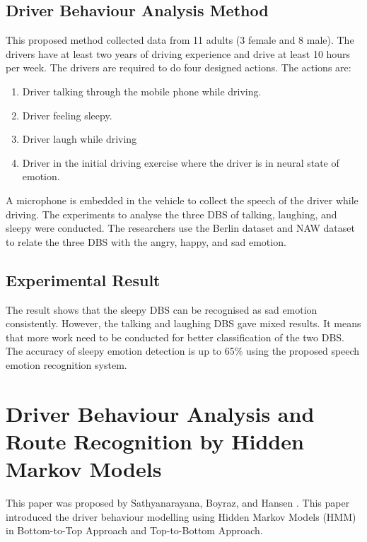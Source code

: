 \subsection{Driver Behaviour Analysis Method}
This proposed method collected data from 11 adults (3 female and 8 male). The drivers have at least two years of driving experience and drive at least 10 hours per week. The drivers are required to do four designed actions. The actions are: 
\begin{enumerate}
\item Driver talking through the mobile phone while driving.
\item Driver feeling sleepy.
\item Driver laugh while driving
\item Driver in the initial driving exercise where the driver is in neural state of emotion.
\end{enumerate}

A microphone is embedded in the vehicle to collect the speech of the driver while driving. The experiments to analyse the three DBS of talking, laughing, and sleepy were conducted. The researchers use the Berlin dataset and NAW dataset to relate the three DBS with the angry, happy, and sad emotion.

\subsection{Experimental Result}
The result shows that the sleepy DBS can be recognised as sad emotion consistently. However, the talking and laughing DBS gave mixed results. It means that more work need to be conducted for better classification of the two DBS. The accuracy of sleepy emotion detection is up to 65\% using the proposed speech emotion recognition system.

\section{Driver Behaviour Analysis and Route Recognition by Hidden Markov Models}
This paper was proposed by Sathyanarayana, Boyraz, and Hansen \citeyear{sath:2008}. This paper introduced the driver behaviour modelling using Hidden Markov Models (HMM) in Bottom-to-Top Approach and Top-to-Bottom Approach.

